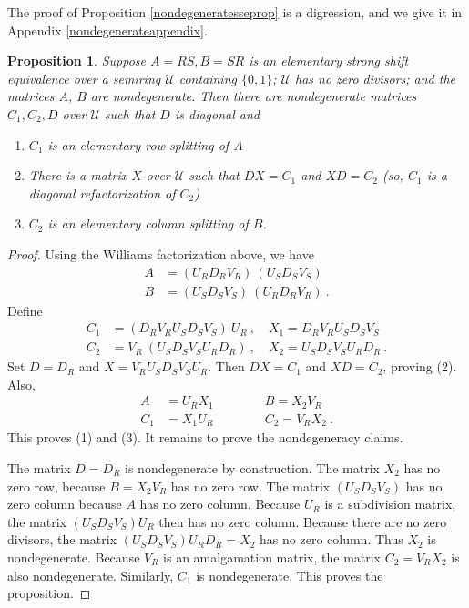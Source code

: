 \documentclass{amsart}
\newtheorem{proposition}[theorem]{Proposition}
\theoremstyle{definition}
\theoremstyle{remark}
\numberwithin{equation}{section}
\begin{document}
{The proof of Proposition \ref{nondegeneratesseprop} is a digression, 
and we give it in Appendix \ref{nondegenerateappendix}.  

\begin{proposition} 
\label{decompprop}
Suppose $A=RS, B=SR$ 
is an elementary strong shift equivalence  
over a semiring $\mathcal U$ containing $\{0,1\}$; 
$\mathcal U$ has no zero divisors; and the matrices 
$A$, $B$ are nondegenerate.   
Then there are nondegenerate matrices $C_1,C_2,D$ 
over $\mathcal U$ such that 
$D$ is diagonal and 
\begin{enumerate} 
\item 
$C_1$ is an elementary row splitting of $A$ 
\item 
There is a matrix $X$ over $\mathcal U$ such that 
$DX=C_1$ and $XD=C_2$ \newline 
(so, $C_1$ is a diagonal refactorization of $C_2$) 
\item 
$C_2$ is an elementary column splitting of $B$. 
\end{enumerate} 
\end{proposition} 

\begin{proof} 

Using the Williams factorization above, we have 
\begin{align*}
A &= (U_RD_RV_R)\ ( U_SD_SV_S) \\ 
B &= (U_SD_SV_S)\ ( U_RD_RV_R) \ . 
\end{align*} 
Define 
\begin{align*}
C_1 &= (D_RV_RU_SD_SV_S)\  U_R  \ , \quad 
X_1 = D_RV_RU_SD_SV_S 
\\ 
C_2 &= 
V_R\ (U_SD_SV_SU_RD_R ) 
\ , \quad 
X_2 = U_SD_SV_SU_RD_R\ . 
\end{align*} 
Set $D=D_R$ and 
  $X= V_RU_SD_SV_SU_R$.  Then 
 $DX=C_1$ and $XD=C_2$, proving (2). Also, 
\begin{align*} 
A   &= 
 U_RX_1 
\qquad \qquad 
B = 
X_2 V_R
\\
C_1 &
=  X_1U_R 
\qquad \qquad 
C_2 
= V_RX_2\ . 
\end{align*}
This proves (1) and (3). It remains to prove the nondegeneracy 
claims. 

The matrix $D=D_R$ is nondegenerate by construction.  
The matrix $X_2$ has no zero row, because $B=X_2V_R$ has 
no zero row. The matrix $(U_SD_SV_S)$ has no zero column because 
$A$ has no zero column. Because $U_R$ is a subdivision matrix, 
the matrix $(U_SD_SV_S)U_R$ then has no zero column. Because 
there are no zero divisors, the matrix 
$(U_SD_SV_S)U_RD_R=X_2$ has no zero column. Thus $X_2$ is nondegenerate. 
Because $V_R$ is an amalgamation matrix, the matrix 
$C_2=V_RX_2$ is also nondegenerate. Similarly, $C_1$ is nondegenerate. 
This proves the proposition. 
\end{proof} 

}
\end{document}
